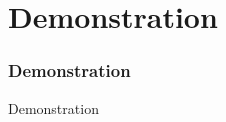 \section{Demonstration}
\begin{frame}
    \frametitle{Demonstration}
    \begin{center}
        \Huge Demonstration
    \end{center}
\end{frame}

\begin{frame}
    \begin{center}
    \end{center}
\end{frame}
